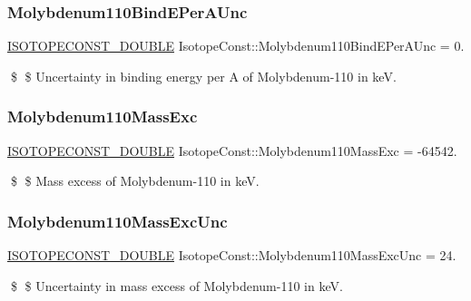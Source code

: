 \subsubsection{\texorpdfstring{Molybdenum110\+Bind\+E\+Per\+A\+Unc}{Molybdenum110BindEPerAUnc}}
{\footnotesize\ttfamily \mbox{\hyperlink{group___isotope_const-_macros_ga8f45a7272ce02c0b4c65c44636ed719a}{I\+S\+O\+T\+O\+P\+E\+C\+O\+N\+S\+T\+\_\+\+D\+O\+U\+B\+LE}} Isotope\+Const\+::\+Molybdenum110\+Bind\+E\+Per\+A\+Unc = 0.}

\$ \$ Uncertainty in binding energy per A of Molybdenum-\/110 in keV. \mbox{\label{group___isotope_const-_molybdenum-_mo110_ga330ac09b6454119f8d3e6896bb3f1d9e}} 
\subsubsection{\texorpdfstring{Molybdenum110\+Mass\+Exc}{Molybdenum110MassExc}}
{\footnotesize\ttfamily \mbox{\hyperlink{group___isotope_const-_macros_ga8f45a7272ce02c0b4c65c44636ed719a}{I\+S\+O\+T\+O\+P\+E\+C\+O\+N\+S\+T\+\_\+\+D\+O\+U\+B\+LE}} Isotope\+Const\+::\+Molybdenum110\+Mass\+Exc = -\/64542.}

\$ \$ Mass excess of Molybdenum-\/110 in keV. \mbox{\label{group___isotope_const-_molybdenum-_mo110_ga6c30cd1fc4d57ffe8547b0d874406f75}} 
\subsubsection{\texorpdfstring{Molybdenum110\+Mass\+Exc\+Unc}{Molybdenum110MassExcUnc}}
{\footnotesize\ttfamily \mbox{\hyperlink{group___isotope_const-_macros_ga8f45a7272ce02c0b4c65c44636ed719a}{I\+S\+O\+T\+O\+P\+E\+C\+O\+N\+S\+T\+\_\+\+D\+O\+U\+B\+LE}} Isotope\+Const\+::\+Molybdenum110\+Mass\+Exc\+Unc = 24.}

\$ \$ Uncertainty in mass excess of Molybdenum-\/110 in keV. \mbox{\label{group___isotope_const-_molybdenum-_mo110_ga8f18d03a03bee47d579ff2f24e305c66}} 
